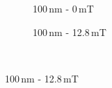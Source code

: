 \begin{figure}
          \begin{subfigure}{0.49\textwidth}
                  \flushleft
                  \caption{100\,nm - 0\,mT}\label{subfig:100nm_0mT}
          \end{subfigure}\hfill
        \begin{subfigure}{0.49\textwidth}
                \flushright
                \caption{100\,nm - 12.8\,mT}\label{subfig:100nm_128mT}
        \end{subfigure}\\        

\end{figure}
